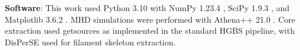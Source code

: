 \documentclass[11pt,a4paper]{article}
\begin{document}
\textbf{Software}: This work used Python 3.10 \citep{Python2023} with NumPy 1.23.4 \citep{Harris2020}, SciPy 1.9.3 \citep{Virtanen2020}, and Matplotlib 3.6.2 \citep{Hunter2007}. MHD simulations were performed with Athena++ 21.0 \citep{Stone2020}. Core extraction used getsources \citep{Men'shchikov2012} as implemented in the standard HGBS pipeline, with DisPerSE \citep{Sousbie2011} used for filament skeleton extraction.



\end{document}
